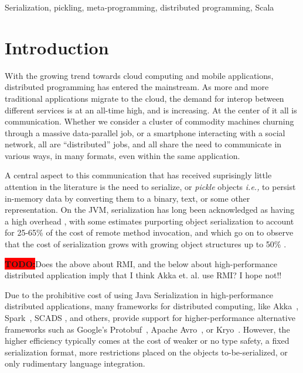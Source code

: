 \documentclass[preprint,10pt]{sigplanconf}
\theoremstyle{definition}
\newcommand{\todo}{{\bf \colorbox{red}{\color{white}TODO:}}}
\begin{document}


\keywords
Serialization, pickling, meta-programming, distributed programming, Scala

\section{Introduction}

With the growing trend towards cloud computing and mobile applications,
distributed programming has entered the mainstream. As more and more
traditional applications migrate to the cloud, the demand for interop between
different services is at an all-time high, and is increasing. At the center of
it all is communication. Whether we consider a cluster of commodity machines
churning through a massive data-parallel job, or a smartphone interacting with
a social network, all are ``distributed'' jobs, and all share the need to
communicate in various ways, in many formats, even within the same
application.

A central aspect to this communication that has received suprisingly little
attention in the literature is the need to serialize, or {\em pickle} objects
{\em i.e.,} to persist in-memory data by converting them to a binary, text, or
some other representation. On the JVM, serialization has long been
acknowledged as having a high overhead \cite{Welsh2000, Carpenter1999}, with
some estimates purporting object serialization to account for 25-65\% of the
cost of remote method invocation, and which go on to observe that the cost of
serialization grows with growing object structures up to 50\%
\cite{Philippsen2000, Maassen1999}.

\todo Does the above about RMI, and the below about high-performance
distributed application imply that I think Akka et. al. use RMI? I hope not!!

Due to the prohibitive cost of using Java Serialization in high-performance
distributed applications, many frameworks for distributed computing, like
Akka~\cite{Akka}, Spark~\cite{Zaharia2012}, SCADS \cite{Armbrust2009}, and
others, provide support for higher-performance alternative frameworks such as
Google's Protobuf~\cite{Protobuf}, Apache Avro~\cite{Avro}, or
Kryo~\cite{Kryo}. However, the higher efficiency typically comes at the cost
of weaker or no type safety, a fixed serialization format, more restrictions
placed on the objects to-be-serialized, or only rudimentary language
integration.
\end{document}

